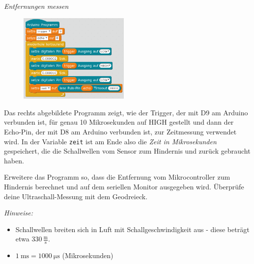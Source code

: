 \begin{aufgabe} \emph{Entfernungen messen}
	
	\begin{figure}
		\centering
		\vspace{-\baselineskip}
		\includegraphics[width=0.48\textwidth]{./pics/ultraschallsensor-start.png}
		\vspace{-\baselineskip}
	\end{figure}
	Das rechts abgebildete Programm zeigt, wie der Trigger, der mit D9 am Arduino verbunden ist, für genau 10 Mikrosekunden auf HIGH gestellt und dann der Echo-Pin, der mit D8 am Arduino verbunden ist, zur Zeitmessung verwendet wird. In der Variable \texttt{zeit} ist am Ende also die \emph{Zeit in Mikrosekunden} gespeichert, die die Schallwellen vom Sensor zum Hindernis und zurück gebraucht haben.
	
	Erweitere das Programm so, dass die Entfernung vom Mikrocontroller zum Hindernis berechnet und auf dem seriellen Monitor ausgegeben wird. Überprüfe deine Ultraschall-Messung mit dem Geodreieck.
%		
	
	\emph{Hinweise:} 
	\begin{itemize}[itemsep=0mm,parsep=0mm]
		\item Schallwellen breiten sich in Luft mit Schallgeschwindigkeit aus - diese beträgt etwa $330\,\frac{\text{m}}{\text{s}}$.
		\item $\SI{1}{\milli\second} = \SI{1000}{\micro\second}$ (Mikrosekunden)
	\end{itemize}
\end{aufgabe}
\restoregeometry
\onehalfspacing

